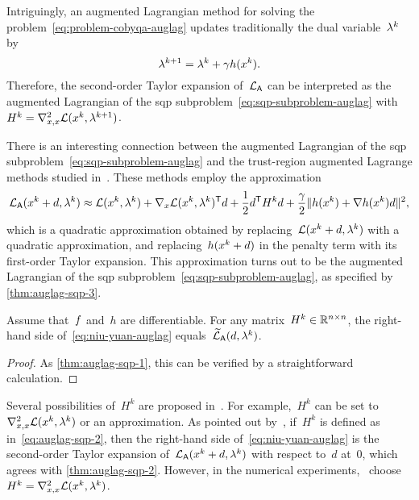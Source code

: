 Intriguingly, an augmented Lagrangian method for solving the problem~\cref{eq:problem-cobyqa-auglag} updates traditionally the dual variable~$\lm[k]$ by
\begin{equation*}
    \lm[k + 1] = \lm[k] + \gamma h(\iter[k]).
\end{equation*}
Therefore, the second-order Taylor expansion of~$\mathcal{L}_{\mathsf{A}}$ can be interpreted as the augmented Lagrangian of the \gls{sqp} subproblem~\cref{eq:sqp-subproblem-auglag} with~$H^k = \nabla_{x, x}^2 \lag(\iter[k], \lm[k + 1])$.

There is an interesting connection between the augmented Lagrangian of the \gls{sqp} subproblem~\cref{eq:sqp-subproblem-auglag} and the trust-region augmented Lagrange methods studied in~\cite{Niu_Yuan_2010,Wang_Yuan_2014}.
These methods employ the approximation
\begin{equation}
    \label{eq:niu-yuan-auglag}
    \auglag(\iter[k] + \step, \lm[k]) \approx \lag(\iter[k], \lm[k]) + \nabla_x \lag(\iter[k], \lm[k])^{\T} d + \frac{1}{2} d^{\T} H^k d + \frac{\gamma}{2} \norm{h(\iter[k]) + \nabla h(\iter[k]) \step}^2,
\end{equation}
which is a quadratic approximation obtained by replacing~$\lag(\iter[k] + d, \lm[k])$ with a quadratic approximation, and replacing~$h(\iter[k] + d)$ in the penalty term with its first-order Taylor expansion.
This approximation turns out to be the augmented Lagrangian of the \gls{sqp} subproblem~\cref{eq:sqp-subproblem-auglag}, as specified by \cref{thm:auglag-sqp-3}.

\begin{theorem}
    \label{thm:auglag-sqp-3}
    Assume that~$f$ and~$h$ are differentiable.
    For any matrix~$H^k \in \mathbb{R}^{n \times n}$, the right-hand side of~\cref{eq:niu-yuan-auglag} equals~$\auglagalt(\step, \lm[k])$.
\end{theorem}

\begin{proof}
    As \cref{thm:auglag-sqp-1}, this can be verified by a straightforward calculation.
\end{proof}

Several possibilities of~$H^k$ are proposed in~\cite{Niu_Yuan_2010,Wang_Yuan_2014}.
For example,~$H^k$ can be set to~$\nabla_{x, x}^2 \lag(\iter[k], \lm[k])$ or an approximation.
As pointed out by~\cite[\S~2.1]{Niu_Yuan_2010}, if~$H^k$ is defined as in~\cref{eq:auglag-sqp-2}, then the right-hand side of~\cref{eq:niu-yuan-auglag} is the second-order Taylor expansion of~$\auglag(\iter[k] + d, \lm[k])$ with respect to~$d$ at~$0$, which agrees with \cref{thm:auglag-sqp-2}.
However, in the numerical experiments,~\cite{Niu_Yuan_2010,Wang_Yuan_2014} choose~$H^k = \nabla_{x, x}^2 \lag(\iter[k], \lm[k])$.

